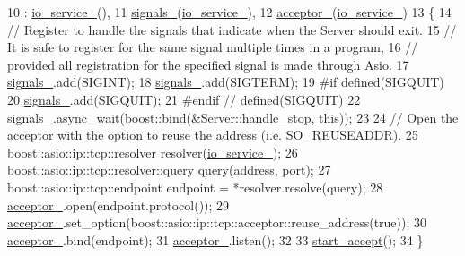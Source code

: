 \begin{DoxyCode}
10             : \hyperlink{classwebsocket_1_1Server_ab3dc5f36bb4b0913c803915d3191a771}{io\_service\_}(),
11             \hyperlink{classwebsocket_1_1Server_a85a9160e9b9f070a4bf8e149623a5a6d}{signals\_}(\hyperlink{classwebsocket_1_1Server_ab3dc5f36bb4b0913c803915d3191a771}{io\_service\_}),
12             \hyperlink{classwebsocket_1_1Server_a377152422807e2f13cc1c6bb18fb416f}{acceptor\_}(\hyperlink{classwebsocket_1_1Server_ab3dc5f36bb4b0913c803915d3191a771}{io\_service\_})
13         \{
14             \textcolor{comment}{// Register to handle the signals that indicate when the Server should exit.}
15             \textcolor{comment}{// It is safe to register for the same signal multiple times in a program,}
16             \textcolor{comment}{// provided all registration for the specified signal is made through Asio.}
17             \hyperlink{classwebsocket_1_1Server_a85a9160e9b9f070a4bf8e149623a5a6d}{signals\_}.add(SIGINT);
18             \hyperlink{classwebsocket_1_1Server_a85a9160e9b9f070a4bf8e149623a5a6d}{signals\_}.add(SIGTERM);
19 \textcolor{preprocessor}{#if defined(SIGQUIT)
}
20             \hyperlink{classwebsocket_1_1Server_a85a9160e9b9f070a4bf8e149623a5a6d}{signals\_}.add(SIGQUIT);
21 \textcolor{preprocessor}{#endif // defined(SIGQUIT)
}
22             \hyperlink{classwebsocket_1_1Server_a85a9160e9b9f070a4bf8e149623a5a6d}{signals\_}.async\_wait(boost::bind(&\hyperlink{classwebsocket_1_1Server_a4abf8e0742d15023f0ac95ced8aee07a}{Server::handle\_stop}, \textcolor{keyword}{this}));
23 
24             \textcolor{comment}{// Open the acceptor with the option to reuse the address (i.e. SO\_REUSEADDR).}
25             boost::asio::ip::tcp::resolver resolver(\hyperlink{classwebsocket_1_1Server_ab3dc5f36bb4b0913c803915d3191a771}{io\_service\_});
26             boost::asio::ip::tcp::resolver::query query(address, port);
27             boost::asio::ip::tcp::endpoint endpoint = *resolver.resolve(query);
28             \hyperlink{classwebsocket_1_1Server_a377152422807e2f13cc1c6bb18fb416f}{acceptor\_}.open(endpoint.protocol());
29             \hyperlink{classwebsocket_1_1Server_a377152422807e2f13cc1c6bb18fb416f}{acceptor\_}.set\_option(boost::asio::ip::tcp::acceptor::reuse\_address(\textcolor{keyword}{true}));
30             \hyperlink{classwebsocket_1_1Server_a377152422807e2f13cc1c6bb18fb416f}{acceptor\_}.bind(endpoint);
31             \hyperlink{classwebsocket_1_1Server_a377152422807e2f13cc1c6bb18fb416f}{acceptor\_}.listen();
32 
33             \hyperlink{classwebsocket_1_1Server_a01514c0f01fc493222b2d8b877dee540}{start\_accept}();
34         \}
\end{DoxyCode}


